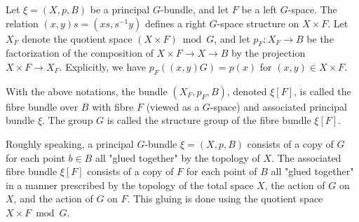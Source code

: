 Let $\xi = (X, p, B)$ be a principal $G$-bundle, and let $F$ be a left $G$-space. The relation $(x, y)s = (xs, s^{-1}y)$ defines a right $G$-space structure on $X \times F$. Let $X_F$ denote the quotient space $(X \times F) \bmod G$, and let $p_F: X_F \rightarrow B$ be the factorization of the composition of $X \times F \rightarrow X \rightarrow B$ by the projection $X \times F \rightarrow X_F$. Explicitly, we have $p_F((x, y)G) = p(x)$ for $(x, y) \in X \times F$.

With the above notations, the bundle $(X_F, p_F, B)$, denoted $\xi[F]$, is called the fibre bundle over $B$ with fibre $F$ (viewed as a $G$-space) and associated principal bundle $\xi$. The group $G$ is called the structure group of the fibre bundle $\xi[F]$.

Roughly speaking, a principal $G$-bundle $\xi = (X, p, B)$ consists of a copy of $G$ for each point $b \in B$ all "glued together" by the topology of $X$. The associated fibre bundle $\xi[F]$ consists of a copy of $F$ for each point of $B$ all "glued together" in a manner prescribed by the topology of the total space $X$, the action of $G$ on $X$, and the action of $G$ on $F$. This gluing is done using the quotient space $X \times F \bmod G$.